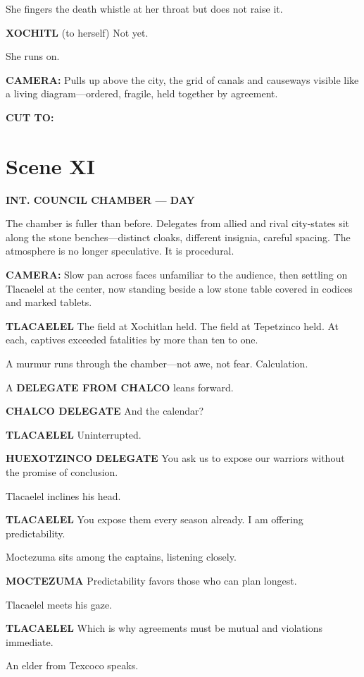 \documentclass[12pt]{article}
\begin{document}
She fingers the death whistle at her throat but does not raise it.

\textbf{XOCHITL}  
(to herself)  
Not yet.

She runs on.

\textbf{CAMERA:} Pulls up above the city, the grid of canals and causeways visible like a living diagram—ordered, fragile, held together by agreement.

\textbf{CUT TO:}

\section*{Scene XI}

\textbf{INT. COUNCIL CHAMBER — DAY}

The chamber is fuller than before. Delegates from allied and rival city-states sit along the stone benches—distinct cloaks, different insignia, careful spacing. The atmosphere is no longer speculative. It is procedural.

\textbf{CAMERA:} Slow pan across faces unfamiliar to the audience, then settling on Tlacaelel at the center, now standing beside a low stone table covered in codices and marked tablets.

\textbf{TLACAELEL}  
The field at Xochitlan held.  
The field at Tepetzinco held.  
At each, captives exceeded fatalities by more than ten to one.

A murmur runs through the chamber—not awe, not fear. Calculation.

A \textbf{DELEGATE FROM CHALCO} leans forward.

\textbf{CHALCO DELEGATE}  
And the calendar?

\textbf{TLACAELEL}  
Uninterrupted.

\textbf{HUEXOTZINCO DELEGATE}  
You ask us to expose our warriors  
without the promise of conclusion.

Tlacaelel inclines his head.

\textbf{TLACAELEL}  
You expose them every season already.  
I am offering predictability.

Moctezuma sits among the captains, listening closely.

\textbf{MOCTEZUMA}  
Predictability favors those who can plan longest.

Tlacaelel meets his gaze.

\textbf{TLACAELEL}  
Which is why agreements must be mutual  
and violations immediate.

An elder from Texcoco speaks.
\end{document}
